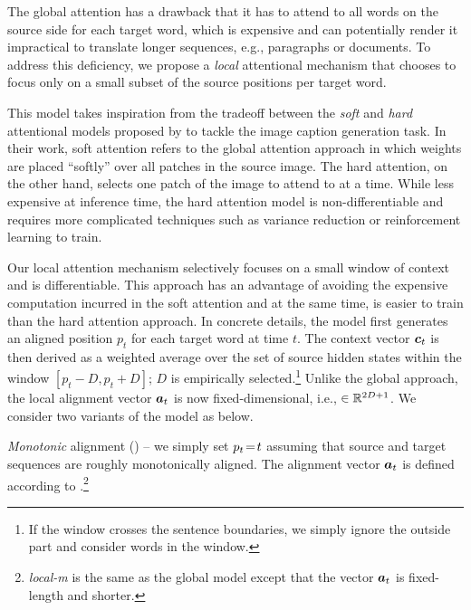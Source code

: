 The global attention has a drawback that it has to attend to all words on the
source side for each target word, which is expensive and can potentially render it impractical to
translate longer sequences, e.g., paragraphs or documents.
To address this deficiency, we propose a {\it local} attentional mechanism that
chooses to focus only on a small subset of the source positions per target word.

This model takes inspiration from the tradeoff between the {\it soft} and {\it
hard} attentional models proposed by  to tackle the image caption
generation task. In their work, soft attention refers to the global attention
approach in which weights are placed ``softly'' over all patches in the source
image. The hard attention, on the other hand, selects one patch
of the image to attend to at a time. While less expensive at inference time, the
hard attention model is non-differentiable and requires more complicated
techniques such as variance reduction or reinforcement learning to train.

Our local attention mechanism selectively focuses on a small window of
context and is differentiable. This approach has an advantage of avoiding the expensive computation incurred in
the soft attention and at the same time, is easier to train than the hard
attention approach.
In concrete details, the model first generates an aligned position $p_t$ for each target word at time $t$. The
context vector $\mbox{\boldmath{$c$}}_{t}$ is then derived as a weighted average over the set of source hidden states within the window $[p_t-D, p_t+D]$; $D$ is
empirically selected.\footnote{If the window crosses the sentence boundaries, we
simply ignore the outside part and consider words in the window.} Unlike the global approach, the local alignment vector $\mbox{\boldmath{$a$}}_{t}$ is now fixed-dimensional, i.e., $\in \mathbb{R}^{2D+1}$. %
We consider two variants of the model as below.

\textit{Monotonic} alignment ({\bf \localm{}}) -- we simply set %
$p_{t}\!=\!t$ assuming that source and target sequences are roughly
monotonically aligned. The alignment vector $\mbox{\boldmath{$a$}}_{t}$ is defined according to
.\footnote{{\it local-m} is the same as
the global model except that the vector $\mbox{\boldmath{$a$}}_{t}$ is
fixed-length and shorter.} %

